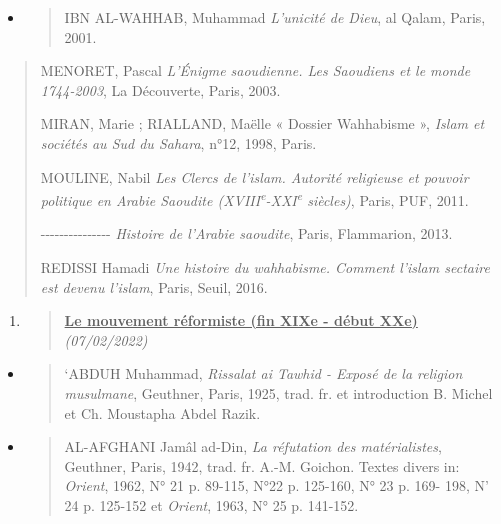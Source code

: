 \begin{itemize}
\item
  \begin{quote}
  IBN AL-WAHHAB, Muhammad \emph{L'unicité de Dieu}, al Qalam, Paris,
  2001.
  \end{quote}
\end{itemize}

\begin{quote}
MENORET, Pascal \emph{L'Énigme saoudienne. Les Saoudiens et le monde
1744-2003}, La Découverte, Paris, 2003.

MIRAN, Marie ; RIALLAND, Maëlle « Dossier Wahhabisme », \emph{Islam et
sociétés au Sud du Sahara}, n°12, 1998, Paris.

MOULINE, Nabil \emph{Les Clercs de l'islam. Autorité religieuse et
pouvoir politique en Arabie Saoudite
(XVIII\textsuperscript{e}-XXI\textsuperscript{e} siècles)}, Paris, PUF,
2011.

-\/-\/-\/-\/-\/-\/-\/-\/-\/-\/-\/-\/-\/-\/- \emph{Histoire de l'Arabie
saoudite}, Paris, Flammarion, 2013.

REDISSI Hamadi \emph{Une histoire du wahhabisme. Comment l'islam
sectaire est devenu l'islam}, Paris, Seuil, 2016.
\end{quote}

\begin{enumerate}
\def\labelenumi{\arabic{enumi}.}
\item
  \begin{quote}
  \textbf{\underline{Le mouvement réformiste (fin XIXe - début XXe)}}
  \emph{(07/02/2022)}
  \end{quote}
\end{enumerate}

\begin{itemize}
\item
  \begin{quote}
  `ABDUH Muhammad, \emph{Rissalat ai Tawhid - Exposé de la religion
  musulmane}, Geuthner, Paris, 1925, trad. fr. et introduction B. Michel
  et Ch. Moustapha Abdel Razik.
  \end{quote}
\item
  \begin{quote}
  AL-AFGHANI Jamâl ad-Din, \emph{La réfutation des matérialistes},
  Geuthner, Paris, 1942, trad. fr. A.-M. Goichon. Textes divers in:
  \emph{Orient}, 1962, N° 21 p. 89-115, N°22 p. 125-160, N° 23 p. 169-
  198, N' 24 p. 125-152 et \emph{Orient}, 1963, N° 25 p. 141-152.
  \end{quote}
\end{itemize}

